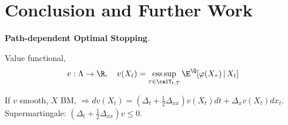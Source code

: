 \chapter{Conclusion and Further Work}  \label{chap:5}

\textbf{Path-dependent Optimal Stopping}. 


Value functional,
$$v: \Lambda \to \R, \quad v(X_t) = \underset{\tau \in \calT_{t,T}}{\text{ess}\sup} \,  \E^{\Q}[\varphi(X_\tau) \,|\, X_t]$$

If $v$ smooth, $X$ BM, $\Longrightarrow dv(X_t) = (\Delta_t +  \frac{1}{2}\Delta_{xx})v(X_t)dt +  \Delta_{x}v(X_t)dx_t$. Supermartingale: $(\Delta_t +  \frac{1}{2}\Delta_{xx})v \le 0$.
